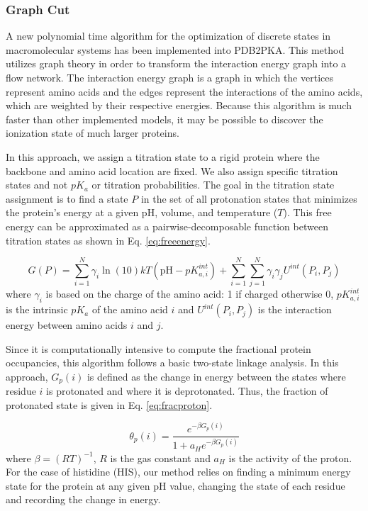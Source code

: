 \documentclass[journal=jpcbfk, manuscript=article]{achemso}
\begin{document}
\subsubsection{Graph Cut}
A new polynomial time algorithm for the optimization of discrete states in macromolecular systems \cite{purvine2016} has been implemented into PDB2PKA. This method utilizes graph theory in order to transform the interaction energy graph into a flow network. The interaction energy graph is a graph in which the vertices represent amino acids and the edges represent the interactions of the amino acids, which are weighted by their respective energies. Because this algorithm is much faster than other implemented models, it may be possible to discover the ionization state of much larger proteins. 

In this approach, we assign a titration state to a rigid protein where the backbone and amino acid location are fixed. We also assign specific titration states and not $pK_a$ or titration probabilities. The goal in the titration state assignment is to find a state $P$ in the set of all protonation states that minimizes the protein's energy at a given pH, volume, and temperature ($T$). This free energy can be approximated as a pairwise-decomposable function between titration states as shown in Eq. \ref{eq:freeenergy}.

\begin{equation}\label{eq:freeenergy}
G(P)=\sum_{i=1}^N \gamma_i \ln(10)kT \left(\mathrm{pH}-pK_{a,i}^{int}\right) + \sum_{i=1}^N \sum_{j=1}^N \gamma_i\gamma_jU^{int}\left(P_i,P_j\right)
\end{equation}
where $\gamma_i$ is based on the charge of the amino acid: 1 if charged otherwise 0, $pK_{a,i}^{int}$ is the intrinsic $pK_a$ of the amino acid $i$ and $U^{int}(P_i,P_j)$ is the interaction energy between amino acids $i$ and $j$.

Since it is computationally intensive to compute the fractional protein occupancies, this algorithm follows a basic two-state linkage analysis. In this approach, $G_p(i)$ is defined as the change in energy between the states where residue $i$ is protonated and where it is deprotonated. Thus, the fraction of protonated state is given in  Eq. \ref{eq:fracproton}.

\begin{equation}\label{eq:fracproton}
	\theta_p(i)=\frac{e^{-\beta G_p(i)}}{1+a_H e^{-\beta G_p(i)}}
\end{equation}
where $\beta=(RT)^{-1}$, $R$ is the gas constant and $a_H$ is the activity of the proton. For the case of histidine (HIS), our method relies on finding a minimum energy state for the protein at any given pH value, changing the state of each residue and recording the change in energy.
\end{document}
